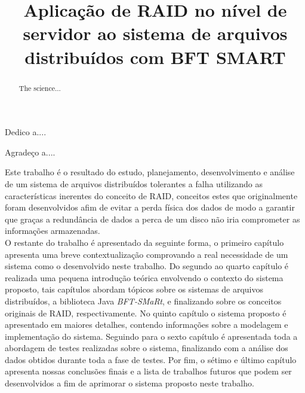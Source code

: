 \documentclass[bacharelado]{unb-cic}
\title{Aplicação de RAID no nível de servidor ao sistema de arquivos distribuídos com BFT SMART}
\begin{document}
\maketitle

\pretextual
\begin{dedicatoria}
Dedico a....
\end{dedicatoria}

\begin{agradecimentos}
Agradeço a....
\end{agradecimentos}

\begin{resumo}
Este trabalho é o resultado do estudo, planejamento, desenvolvimento e análise de um sistema de arquivos distribuídos tolerantes a falha utilizando as características inerentes do conceito de RAID, conceitos estes que originalmente foram desenvolvidos afim de evitar a perda física dos dados de modo a garantir que graças a redundância de dados a perca de um disco não iria comprometer as informações armazenadas.
\\

O restante do trabalho é apresentado da seguinte forma, o primeiro capítulo apresenta uma breve contextualização comprovando a real necessidade de um sistema como o desenvolvido neste trabalho. Do segundo ao quarto capítulo é realizada uma pequena introdução teórica envolvendo o contexto do sistema proposto, tais capítulos abordam tópicos sobre os sistemas de arquivos distribuídos, a biblioteca Java \textit{BFT-SMaRt}, e finalizando sobre os conceitos originais de RAID, respectivamente. No quinto capítulo o sistema proposto é apresentado em maiores detalhes, contendo informações sobre a modelagem e implementação do sistema. Seguindo para o sexto capítulo é apresentada toda a abordagem de testes realizadas sobre o sistema, finalizando com a análise dos dados obtidos durante toda a fase de testes. Por fim, o sétimo e último capítulo apresenta nossas conclusões finais e a lista de trabalhos futuros que podem ser desenvolvidos a fim de aprimorar o sistema proposto neste trabalho.
\\

\end{resumo}


\begin{abstract}
The science...
\end{abstract}

\tableofcontents
\listoffigures
\listoftables

\textual



















\postextual




\end{document}

